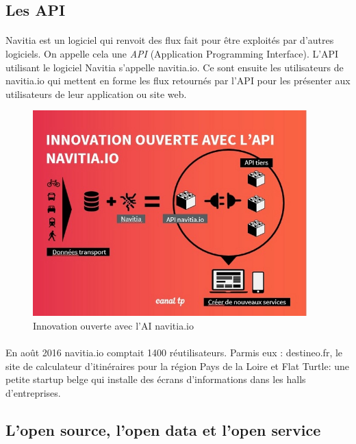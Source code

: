 \documentclass[a4paper]{report}
\begin{document}
\subsection{Les API} 
\paragraph{} Navitia est un logiciel qui renvoit des flux fait pour être exploités par d'autres logiciels. On appelle cela une  \emph{API} (Application Programming Interface). L'API utilisant le logiciel Navitia s'appelle navitia.io. Ce sont ensuite les utilisateurs de navitia.io qui mettent en forme les flux retournés par l'API pour les présenter aux utilisateurs de leur application ou site web. 

\begin{figure}[H] 
	\begin{center}
		\includegraphics[width=300pt]{image/API_navitia}
		\caption{Innovation ouverte avec l'AI navitia.io}
		\label{Innovation ouverte avec l'AI navitia.io}
	\end{center}
\end{figure}

\paragraph{} En août 2016 navitia.io comptait 1400 réutilisateurs. Parmis eux : destineo.fr, le site de calculateur d'itinéraires pour la région Pays de la Loire et Flat Turtle: une petite startup belge qui installe des écrans d’informations dans les halls d’entreprises. 

\subsection{L'open source, l'open data et l'open service}
\end{document}
